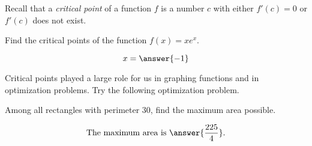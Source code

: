 \documentclass{ximera}
\begin{document}
Recall that a \emph{critical point} of a function $f$ is a number $c$  with either $f'(c)=0$ or $f'(c)$ does not exist.
\begin{question}
	Find the critical points of the function $\displaystyle f(x) = x e^x$.
	
	\begin{prompt} \[x = \answer{-1}\]\end{prompt}
\end{question}

Critical points played a large role for us in graphing functions and in optimization problems. Try the following optimization problem.
\begin{question}
	Among all rectangles with perimeter $30$, find the maximum area possible.
	
	
	\begin{prompt} \[ \textrm{The maximum area is } \answer{\frac{225}{4}}. \] \end{prompt}
\end{question}
\end{document}
